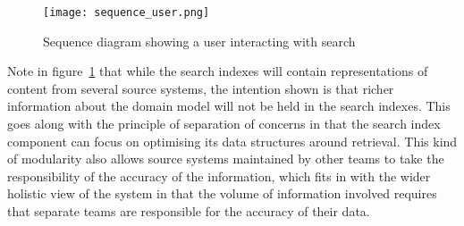 \documentclass[a4paper]{report}
\begin{document}
\begin{comment}
@startuml sequence_user.png

skinparam monochrome true

actor User
participant "BBC Website" as www
participant "Search Service" as search
participant "Search Indexes" as indexes
participant "Source Service" as source

User -> www : types query into search box
activate www

  www -> search
  activate search

    note over search
      The service may want to vary the
      query for a number of reasons such
      as the type of device the user has
      or the nature of the query itself.
    end note

    search -> search : decide query parameters

    search -> indexes : raw query
    activate indexes
    indexes --> search : list of matching items
    deactivate indexes

    loop for each item
      search -> source : Fetch more info about item
      activate source

      note right of search
        We can enrich the retrieved items with
        more information from the original source
        systems rather than replicate all domain
        knowledge in the search indexes.
      end note

      source --> search : Returns richer info
      deactivate source
    end

  search --> www : list of enriched results
  deactivate search

www --> User : search results page
deactivate www

@enduml
\end{comment}
\begin{figure}[p]
  \begin{center}
    \texttt{[image: sequence\_user.png]}
  \end{center}
  \caption{Sequence diagram showing a user interacting with search\label{sequence-user}}
\end{figure}

Note in figure~\ref{sequence-user} that while the search indexes
will contain representations of content
from several source systems, the intention shown is that richer information
about the domain model will not be held in the search indexes. This goes
along with the principle of separation of concerns\cite{dijkstra1982role}
in that the search index component can focus on optimising its data
structures around retrieval. This kind of modularity also allows source
systems maintained by other teams to take the responsibility of the
accuracy of the information, which fits in with the wider holistic view
of the system in that the volume of information involved requires that
separate teams are responsible for the accuracy of their data.
\end{document}
